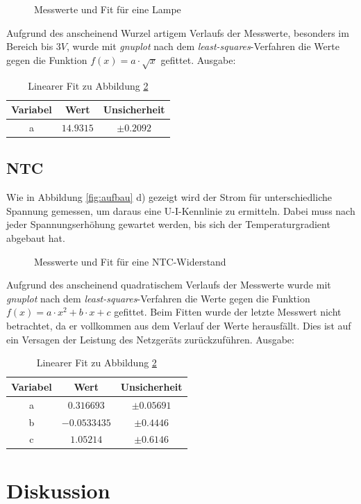 \begin{figure}[H]
\centering

\caption{Messwerte und Fit für eine Lampe}
\label{fig:Lampe}
\end{figure}
Aufgrund des anscheinend Wurzel artigem Verlaufs der Messwerte, besonders im Bereich bis $3V$, wurde mit \emph{gnuplot} nach dem \emph{least-squares}-Verfahren die Werte gegen die Funktion $f(x)=a\cdot\sqrt{x}$ gefittet. Ausgabe:
\begin{table}[H]
  \centering
  \begin{tabular}{c | c | c }
    Variabel   & Wert & Unsicherheit\\ \hline
    a & $\num{14,9315}$ & $\pm\num{0,2092}$ \\
   
  \end{tabular}
  \caption{Linearer Fit zu Abbildung \ref{fig:Lampe}}
  \label{tab:fitlampe}
\end{table}
\subsection{NTC}
Wie in Abbildung \ref{fig:aufbau} d) gezeigt wird der Strom für unterschiedliche Spannung gemessen, um daraus eine U-I-Kennlinie zu ermitteln. Dabei muss nach jeder Spannungserhöhung gewartet werden, bis sich der Temperaturgradient abgebaut hat. 

\begin{figure}[H]
\centering

\caption{Messwerte und Fit für eine NTC-Widerstand}
\label{fig:Lampe}
\end{figure}
Aufgrund des anscheinend quadratischem Verlaufs der Messwerte wurde mit \emph{gnuplot} nach dem \emph{least-squares}-Verfahren die Werte gegen die Funktion $f(x)=a\cdot x^2+b\cdot x+c$ gefittet. Beim Fitten wurde der letzte Messwert nicht betrachtet, da er vollkommen aus dem Verlauf der Werte herausfällt. Dies ist auf ein Versagen der Leistung des Netzgeräts zurückzuführen. Ausgabe:
\begin{table}[H]
  \centering
  \begin{tabular}{c | c | c }
    Variabel   & Wert & Unsicherheit\\ \hline
    a & $\num{0,316693}$ & $\pm\num{0,05691}$ \\
    b & $\num{-0,0533435}$ & $\pm\num{0,4446}$ \\
    c & $\num{1,05214}$ & $\pm\num{0,6146}$ \\
  \end{tabular}
  \caption{Linearer Fit zu Abbildung \ref{fig:Lampe}}
  \label{tab:fitlampe}
\end{table}


\section{Diskussion}
